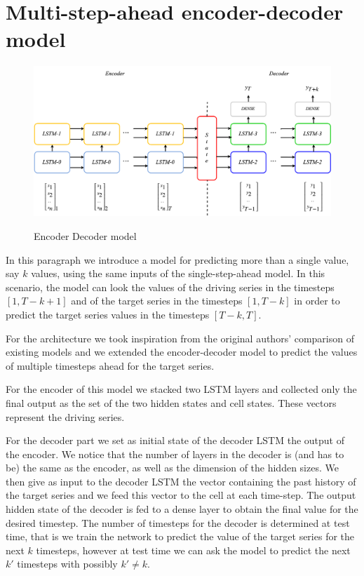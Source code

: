 \documentclass{article}
\begin{document}
\section{Multi-step-ahead encoder-decoder model}

\begin{figure}[ht]
\centering
\includegraphics[width=0.9\linewidth]{ende-rnn.png} \\
\caption{Encoder Decoder model}
\label{fig:ende-rnn}
\end{figure}


In this paragraph we introduce a model for predicting more than a single value,
say $k$ values, using the same inputs of the single-step-ahead model. 
In this scenario, the model can look the values of the driving series
in the timesteps $[1, T - k + 1]$ and of the
target series in the timesteps $[1, T - k]$ in order to predict the target
series values in the timesteps $[T - k, T]$.

For the architecture we took inspiration from the original authors' comparison of
existing models and we extended the encoder-decoder model to predict the values
of multiple timesteps ahead for the target series.

For the encoder of this model we stacked two LSTM layers and collected only the 
final output as the set of the two hidden states and cell states. These vectors
represent the driving series.

For the decoder part we set as initial state of the decoder LSTM the output of the
encoder. We notice that the number of layers in the decoder is (and has to be) the
same as the encoder, as well as the dimension of the hidden sizes. We then give as
input to the decoder LSTM the vector containing the past history of the target 
series and we feed this vector to the cell at each time-step. The output hidden
state of the decoder is fed to a dense layer to obtain the final value for the 
desired timestep. The number of timesteps for the decoder is determined at test
time, that is we train the network to predict the value of the target series for
the next $k$ timesteps, however at test time we can ask the model to predict the 
next $k'$ timesteps with possibly $k' \ne k$.
\end{document}

